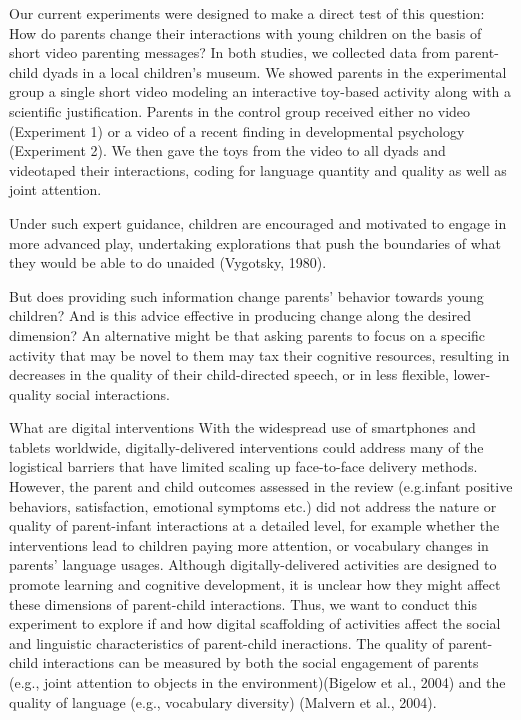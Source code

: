 \documentclass[]{article}
\begin{document}
Our current experiments were designed to make a direct test of this
question: How do parents change their interactions with young children
on the basis of short video parenting messages? In both studies, we
collected data from parent-child dyads in a local children's museum. We
showed parents in the experimental group a single short video modeling
an interactive toy-based activity along with a scientific justification.
Parents in the control group received either no video (Experiment 1) or
a video of a recent finding in developmental psychology (Experiment 2).
We then gave the toys from the video to all dyads and videotaped their
interactions, coding for language quantity and quality as well as joint
attention.

Under such expert guidance, children are encouraged and motivated to
engage in more advanced play, undertaking explorations that push the
boundaries of what they would be able to do unaided (Vygotsky, 1980).

But does providing such information change parents' behavior towards
young children? And is this advice effective in producing change along
the desired dimension? An alternative might be that asking parents to
focus on a specific activity that may be novel to them may tax their
cognitive resources, resulting in decreases in the quality of their
child-directed speech, or in less flexible, lower-quality social
interactions.

What are digital interventions With the widespread use of smartphones
and tablets worldwide, digitally-delivered interventions could address
many of the logistical barriers that have limited scaling up
face-to-face delivery methods. However, the parent and child outcomes
assessed in the review (e.g.infant positive behaviors, satisfaction,
emotional symptoms etc.) did not address the nature or quality of
parent-infant interactions at a detailed level, for example whether the
interventions lead to children paying more attention, or vocabulary
changes in parents' language usages. Although digitally-delivered
activities are designed to promote learning and cognitive development,
it is unclear how they might affect these dimensions of parent-child
interactions. Thus, we want to conduct this experiment to explore if and
how digital scaffolding of activities affect the social and linguistic
characteristics of parent-child ineractions. The quality of parent-child
interactions can be measured by both the social engagement of parents
(e.g., joint attention to objects in the environment)(Bigelow et al.,
2004) and the quality of language (e.g., vocabulary diversity) (Malvern
et al., 2004).
\end{document}

